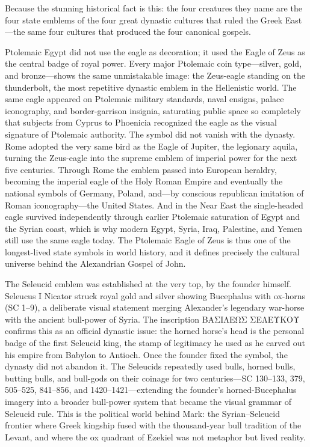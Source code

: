 Because the stunning historical fact is this: the four creatures they name are the four state emblems of the four great dynastic cultures that ruled the Greek East---the same four cultures that produced the four canonical gospels.

Ptolemaic Egypt did not use the eagle as decoration; it used the Eagle of Zeus as the central badge of royal power.
Every major Ptolemaic coin type---silver, gold, and bronze---shows the same unmistakable image: the Zeus-eagle standing on the thunderbolt, the most repetitive dynastic emblem in the Hellenistic world.
The same eagle appeared on Ptolemaic military standards, naval ensigns, palace iconography, and border-garrison insignia, saturating public space so completely that subjects from Cyprus to Phoenicia recognized the eagle as the visual signature of Ptolemaic authority.
The symbol did not vanish with the dynasty.
Rome adopted the very same bird as the Eagle of Jupiter, the legionary aquila, turning the Zeus-eagle into the supreme emblem of imperial power for the next five centuries.
Through Rome the emblem passed into European heraldry, becoming the imperial eagle of the Holy Roman Empire and eventually the national symbols of Germany, Poland, and---by conscious republican imitation of Roman iconography---the United States.
And in the Near East the single-headed eagle survived independently through earlier Ptolemaic saturation of Egypt and the Syrian coast, which is why modern Egypt, Syria, Iraq, Palestine, and Yemen still use the same eagle today.
The Ptolemaic Eagle of Zeus is thus one of the longest-lived state symbols in world history, and it defines precisely the cultural universe behind the Alexandrian Gospel of John.

The Seleucid emblem was established at the very top, by the founder himself.
Seleucus I Nicator struck royal gold and silver showing Bucephalus with ox-horns (SC 1--9), a deliberate visual statement merging Alexander's legendary war-horse with the ancient bull-power of Syria.
The inscription ΒΑΣΙΛΕΩΣ ΣΕΛΕΥΚΟΥ confirms this as an official dynastic issue: the horned horse's head is the personal badge of the first Seleucid king, the stamp of legitimacy he used as he carved out his empire from Babylon to Antioch.
Once the founder fixed the symbol, the dynasty did not abandon it.
The Seleucids repeatedly used bulls, horned bulls, butting bulls, and bull-gods on their coinage for two centuries---SC 130--133, 379, 505--525, 841--856, and 1420--1421---extending the founder's horned-Bucephalus imagery into a broader bull-power system that became the visual grammar of Seleucid rule.
This is the political world behind Mark: the Syrian--Seleucid frontier where Greek kingship fused with the thousand-year bull tradition of the Levant, and where the ox quadrant of Ezekiel was not metaphor but lived reality.

